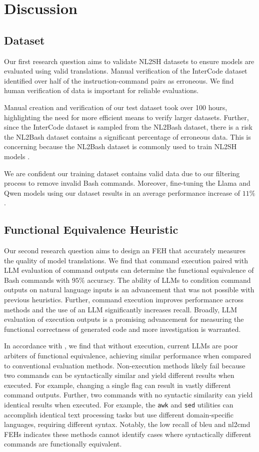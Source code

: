 \documentclass[11pt]{article}
\begin{document}
\section{Discussion}
\label{sec:discussion}
\subsection{Dataset}
Our first research question aims to validate NL2SH datasets to ensure models are evaluated using valid translations. Manual verification of the InterCode dataset identified over half of the instruction-command pairs as erroneous. We find human verification of data is important for reliable evaluations.

Manual creation and verification of our test dataset took over 100 hours, highlighting the need for more efficient means to verify larger datasets. Further, since the InterCode dataset is sampled from the NL2Bash dataset, there is a risk the NL2Bash dataset contains a significant percentage of erroneous data. This is concerning because the NL2Bash dataset is commonly used to train NL2SH models \cite{Magnum,Tellina,ShellGPT,AST,bash-assistant}.

We are confident our training dataset contains valid data due to our filtering process to remove invalid Bash commands. Moreover, fine-tuning the Llama and Qwen models using our dataset results in an average performance increase of $11\%$.

\subsection{Functional Equivalence Heuristic}
Our second research question aims to design an FEH that accurately measures the quality of model translations. We find that command execution paired with LLM evaluation of command outputs can determine the functional equivalence of Bash commands with $95\%$ accuracy. The ability of LLMs to condition command outputs on natural language inputs is an advancement that was not possible with previous heuristics. Further, command execution improves performance across methods and the use of an LLM significantly increases recall. Broadly, LLM evaluation of execution outputs is a promising advancement for measuring the functional correctness of generated code and more investigation is warranted.

In accordance with \citet{lackunderstanding}, we find that without execution, current LLMs are poor arbiters of functional equivalence, achieving similar performance when compared to conventional evaluation methods. Non-execution methods likely fail because two commands can be syntactically similar and yield different results when executed. For example, changing a single flag can result in vastly different command outputs. Further, two commands with no syntactic similarity can yield identical results when executed. For example, the \texttt{awk} and \texttt{sed} utilities can accomplish identical text processing tasks but use different domain-specific languages, requiring different syntax. Notably, the low recall of bleu and nl2cmd FEHs indicates these methods cannot identify cases where syntactically different commands are functionally equivalent.
\end{document}
